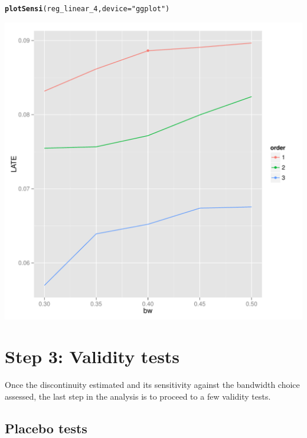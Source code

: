 \documentclass[english,nojss]{jss}\usepackage{graphicx, color}
\makeatletter
\def\maxwidth{ %
  \ifdim\Gin@nat@width>\linewidth
    \linewidth
  \else
    \Gin@nat@width
  \fi
}
\newcommand{\hlfunctioncall}[1]{\textcolor[rgb]{0.501960784313725,0,0.329411764705882}{\textbf{#1}}}%
\newcommand{\hlstring}[1]{\textcolor[rgb]{0.6,0.6,1}{#1}}%
\newenvironment{kframe}{%
 \def\at@end@of@kframe{}%
 \ifinner\ifhmode%
  \def\at@end@of@kframe{\end{minipage}}%
  \begin{minipage}{\columnwidth}%
 \fi\fi%
 \def\FrameCommand##1{\hskip\@totalleftmargin \hskip-\fboxsep
 \colorbox{shadecolor}{##1}\hskip-\fboxsep
     \hskip-\linewidth \hskip-\@totalleftmargin \hskip\columnwidth}%
 \MakeFramed {\advance\hsize-\width
   \@totalleftmargin\z@ \linewidth\hsize
   \@setminipage}}%
 {\par\unskip\endMakeFramed%
 \at@end@of@kframe}
\newenvironment{knitrout}{}{} %
\makeatother
\begin{document}
\begin{knitrout}
\color{fgcolor}\begin{kframe}
\begin{alltt}
\hlfunctioncall{plotSensi}(reg_linear_4, device = \hlstring{"ggplot"})
\end{alltt}
\end{kframe}
\includegraphics[width=\maxwidth]{figure/unnamed-chunk-14} 

\end{knitrout}



\section{Step 3: Validity tests}


Once the discontinuity estimated and its sensitivity against the bandwidth
choice assessed, the last step in the analysis is to proceed to a
few validity tests. 


\subsection{Placebo tests}
\end{document}
